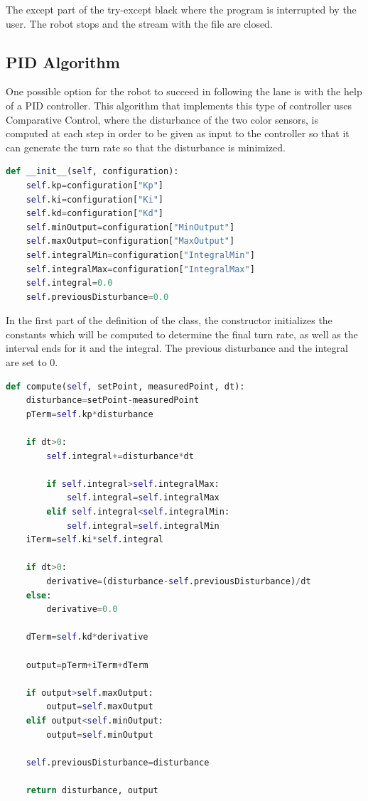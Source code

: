 The except part of the try-except black where the program is interrupted by the user. The robot stops and the stream with the file are closed.

\subsection{PID Algorithm}
\label{sec:pid}

One possible option for the robot to succeed in following the lane is with the help of a PID controller. This algorithm that implements this type of controller uses Comparative Control, where the disturbance of the two color sensors, is computed at each step in order to be given as input to the controller so that it can generate the turn rate so that the disturbance is minimized.

\begin{lstlisting}[language=Python, caption={PIDAlgorithm constructor.}, label={lst:lk-init}]
def __init__(self, configuration):
    self.kp=configuration["Kp"]
    self.ki=configuration["Ki"]
    self.kd=configuration["Kd"]
    self.minOutput=configuration["MinOutput"]
    self.maxOutput=configuration["MaxOutput"]
    self.integralMin=configuration["IntegralMin"]
    self.integralMax=configuration["IntegralMax"]
    self.integral=0.0
    self.previousDisturbance=0.0
\end{lstlisting}

In the first part of the definition of the class, the constructor initializes the constants which will be computed to determine the final turn rate, as well as the interval ends for it and the integral. The previous disturbance and the integral are set to 0.

\begin{lstlisting}[language=Python, caption={PIDAlgorithm compute method.}, label={lst:lk-init}]
def compute(self, setPoint, measuredPoint, dt):
    disturbance=setPoint-measuredPoint
    pTerm=self.kp*disturbance
    
    if dt>0:
        self.integral+=disturbance*dt
        
        if self.integral>self.integralMax:
            self.integral=self.integralMax
        elif self.integral<self.integralMin:
            self.integral=self.integralMin
    iTerm=self.ki*self.integral
    
    if dt>0:
        derivative=(disturbance-self.previousDisturbance)/dt
    else:
        derivative=0.0
        
    dTerm=self.kd*derivative
    
    output=pTerm+iTerm+dTerm
    
    if output>self.maxOutput:
        output=self.maxOutput
    elif output<self.minOutput:
        output=self.minOutput
        
    self.previousDisturbance=disturbance
    
    return disturbance, output
\end{lstlisting}

